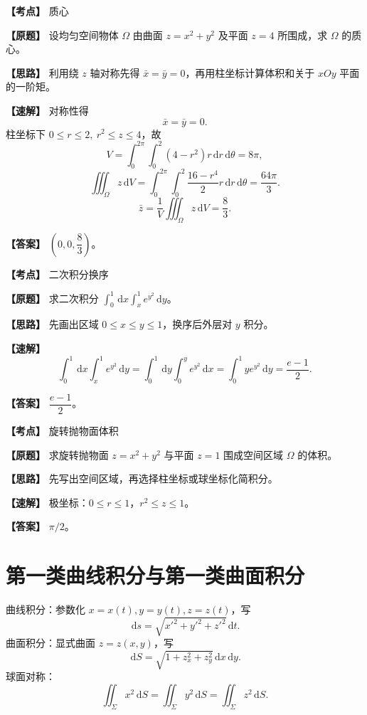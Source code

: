 ﻿\documentclass[11pt,a4paper,UTF8]{ctexart}
\newcommand{\dd}{\,\mathrm d}
\begin{document}
\newpage

\begin{answerbox}[2024--2025 六]
\textbf{【考点】} 质心

\textbf{【原题】} 设均匀空间物体 $\Omega$ 由曲面 $z=x^2+y^2$ 及平面 $z=4$ 所围成，求 $\Omega$ 的质心。

\textbf{【思路】} 利用绕 $z$ 轴对称先得 $\bar x=\bar y=0$，再用柱坐标计算体积和关于 $xOy$ 平面的一阶矩。

\textbf{【速解】} 对称性得
\[
\bar x=\bar y=0.
\]
柱坐标下 $0\le r\le2,\ r^2\le z\le4$，故
\[
V=\int_0^{2\pi}\int_0^2(4-r^2)r\dd r\dd\theta=8\pi,
\]
\[
\iiint_\Omega z\dd V
=\int_0^{2\pi}\int_0^2\frac{16-r^4}{2}r\dd r\dd\theta
=\frac{64\pi}{3}.
\]
\[
\bar z=\frac{1}{V}\iiint_\Omega z\dd V=\frac83.
\]

\textbf{【答案】} $\left(0,0,\dfrac83\right)$。
\end{answerbox}

\begin{answerbox}[2024--2025 一-3]
\textbf{【考点】} 二次积分换序

\textbf{【原题】} 求二次积分 $\displaystyle \int_0^1\dd x\int_x^1 e^{y^2}\dd y$。

\textbf{【思路】} 先画出区域 $0\le x\le y\le1$，换序后外层对 $y$ 积分。

\textbf{【速解】}
\[
\int_0^1\dd x\int_x^1 e^{y^2}\dd y
=\int_0^1\dd y\int_0^y e^{y^2}\dd x
=\int_0^1y e^{y^2}\dd y=\frac{e-1}{2}.
\]

\textbf{【答案】} $\dfrac{e-1}{2}$。
\end{answerbox}

\begin{answerbox}[2023--2024 一-2]
\textbf{【考点】} 旋转抛物面体积

\textbf{【原题】} 求旋转抛物面 $z=x^2+y^2$ 与平面 $z=1$ 围成空间区域 $\Omega$ 的体积。

\textbf{【思路】} 先写出空间区域，再选择柱坐标或球坐标化简积分。

\textbf{【速解】} 极坐标：$0\le r\le1$，$r^2\le z\le1$。

\textbf{【答案】} $\pi/2$。
\end{answerbox}
\section{第一类曲线积分与第一类曲面积分}

\begin{templatebox}[第一类积分模板]
曲线积分：参数化 $x=x(t),y=y(t),z=z(t)$，写
\[
\dd s=\sqrt{x'^2+y'^2+z'^2}\dd t.
\]
曲面积分：显式曲面 $z=z(x,y)$，写
\[
\dd S=\sqrt{1+z_x^2+z_y^2}\dd x\dd y.
\]
球面对称：
\[
\iint_\Sigma x^2\dd S=\iint_\Sigma y^2\dd S=\iint_\Sigma z^2\dd S.
\]
\end{templatebox}
\end{document}
